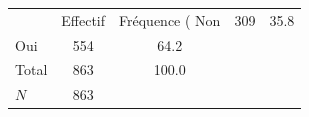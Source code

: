 {
\def\sym#1{\ifmmode^{#1}\else\(^{#1}\)\fi}
\begin{tabular}{l*{1}{cc}}
\toprule
            &    Effectif&Fréquence (%
\midrule
Non         &         309&        35.8\\
Oui         &         554&        64.2\\
Total       &         863&       100.0\\
\midrule
\(N\)       &         863&            \\
\bottomrule
\end{tabular}
}
